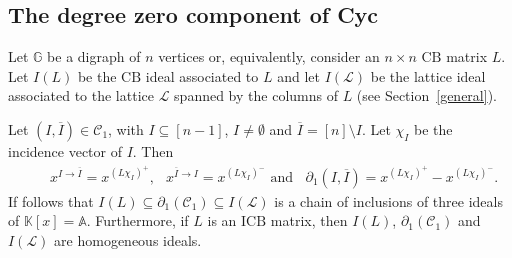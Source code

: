 \documentclass[ALCO]{cedram}
\newcommand{\mbk}{\mbox{$\mathbb{K}$}}
\newcommand{\mba}{\mbox{$\mathbb{A}$}}
\newcommand{\mbg}{\mbox{$\mathbb{G}$}}
\newcommand{\mcc}{\mbox{$\mathcal{C}$}}
\newcommand{\mcl}{\mbox{$\mathcal{L}$}}
\newcommand{\icb}{\mbox{$\mathrm{ICB}$}}
\newcommand{\cb}{\mbox{$\mathrm{CB}$}}
\newcommand{\dif}{\mbox{$\partial$}}
\begin{document}
\subsection{The degree zero component of Cyc}

 Let $\mbg$ be a digraph of $n$ vertices or, equivalently,
consider an $n\times n$ $\cb$ matrix $L$. Let $I(L)$ be the $\cb$
ideal associated to $L$ and let $I(\mcl)$ be the lattice ideal
associated to the lattice $\mcl$ spanned by the columns of $L$ (see
Section~\ref{general}).

\begin{remark}\label{Iind1C}
Let $(I,\overline{I})\in \mcc_1$, with $I\subseteq [n-1]$,
$I\neq\emptyset$ and $\overline{I}=[n]\setminus I$. Let $\chi_I$ be
the incidence vector of $I$. Then
\begin{eqnarray}\label{d1(I,J)}
\phantom{++} x^{I\to\overline{I}}=x^{(L\chi_I)^+}\mbox{, }\;\; x^{\overline{I}\to
  I}=x^{(L\chi_I)^-}\mbox{ and }\;\;\dif_1(I,\overline{I})=
x^{(L\chi_I)^+}-x^{(L\chi_I)^-}.
\end{eqnarray}
If follows that $I(L)\subseteq \dif_1(\mcc_1)\subseteq I(\mcl)$ is a
chain of inclusions of three ideals of $\mbk[x]=\mba$. Furthermore, if
$L$ is an $\icb$ matrix, then $I(L)$, $\dif_1(\mcc_1)$ and $I(\mcl)$ are
homogeneous ideals.
\end{remark}
\end{document}
